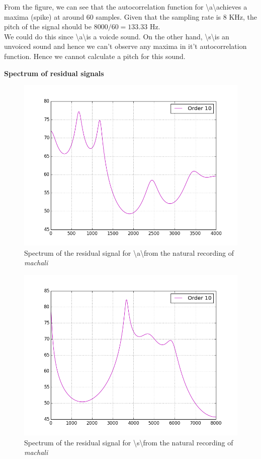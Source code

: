 \documentclass[a4paper]{article}
\begin{document}
From the figure, we can see that the autocorrelation function for \textbackslash a\textbackslash achieves a maxima (spike) at around 60 samples. Given that the sampling rate is $8$ KHz, the pitch of the signal should be $8000/60 = 133.33$ Hz. \\
We could do this since \textbackslash a\textbackslash is a voicde sound. On the other hand, \textbackslash s\textbackslash is an unvoiced sound and hence we can't observe any maxima in it't autocorrelation function. Hence we cannot calculate a pitch for this sound. 

\textbf{Spectrum of residual signals}

\begin{figure}[h!]
    \includegraphics[width=\linewidth]{./images/res_spec_a.png}
    \caption{Spectrum of the residual signal for  \textbackslash a\textbackslash from the natural recording of \textit{machali}}
    \label{fig:1}
\end{figure}


\begin{figure}[h!]
    \includegraphics[width=\linewidth]{./images/res_spec_s.png}
    \caption{Spectrum of the residual signal for \textbackslash s\textbackslash from the natural recording of \textit{machali}}
    \label{fig:1}
\end{figure}
\end{document}
